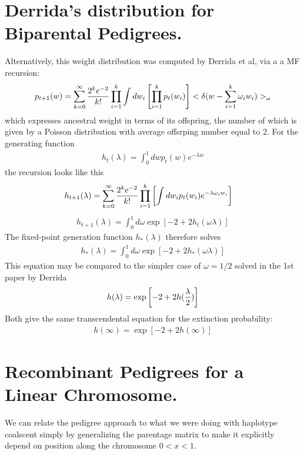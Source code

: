 \documentclass{article}
\begin{document}
\section*{Derrida's distribution for Biparental Pedigrees.}
Alternatively, this weight distribution was computed by Derrida et al, via a a MF recursion:
\begin{eqnarray}
 p_{t+1} (w) =\sum_{k=0}^{\infty}{2^k e^{-2}\over k!} \prod_{i=1}^k \int d{w_i} \left [\prod_{i=1}^k p_t( w_i) \right ] <\delta(w-\sum_{i=1}^k \omega_i w_i )>_{\omega}
\end{eqnarray}
which expresses ancestral weight in terms of its offspring, the number of which is given by a Poisson distribution with average offsrping number equal to 2. For the generating function
\begin{eqnarray}
h_t(\lambda)=\int_0^1 dw p_t (w) e^{-\lambda w}
\end{eqnarray}
the recursion looks like this
\begin{eqnarray}
& h_{t+1} (\lambda) =\sum_{k=0}^{\infty}{2^k e^{-2}\over k!} \prod_{i=1}^k \left [\int d{ w_i} p_t( w_i) e^{-\lambda \omega_i w_i}\right ] 
\end{eqnarray}
\begin{eqnarray}
h_{t+1} (\lambda)=\int_0^1 d\omega \exp \left [ -2+2 h_t (\omega \lambda) \right ] 
\end{eqnarray}
The fixed-point generation function $h_* (\lambda)$ therefore solves
\begin{eqnarray}
h_* (\lambda)=\int_0^1 d\omega \exp \left [ -2+2 h_* (\omega \lambda) \right ] 
\end{eqnarray}
This equation may be compared to the simpler case of $\omega=1/2$ solved in the 1st paper by Derrida
\begin{eqnarray}
h(\lambda)= \exp \left [ -2+2 h ({ \lambda \over 2}) \right ] 
\end{eqnarray}
Both give the same transcendental equation for the extinction probability:
\begin{eqnarray}
h(\infty)= \exp \left [ -2+2 h (\infty) \right ] 
\end{eqnarray}

\section*{Recombinant Pedigrees for a Linear Chromosome.}
We can relate the pedigree approach to what we were doing with haplotype coalscent simply by generalizing the parentage matrix to make it explicitly depend on position along the chromosome $0<x<1$.
\end{document}
